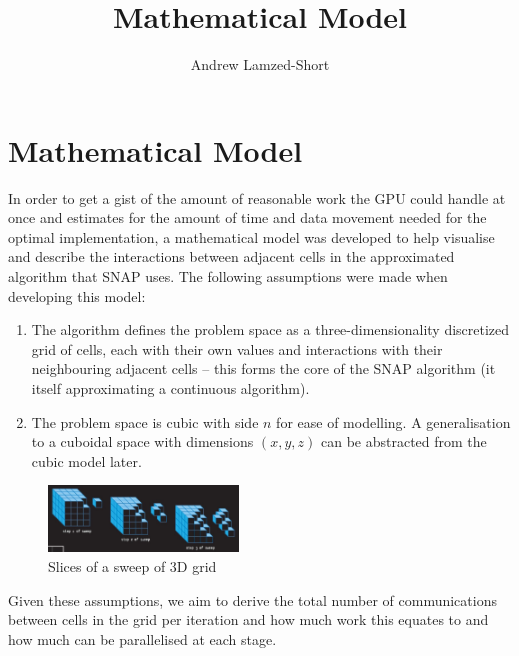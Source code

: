 \documentclass{article}
\begin{document}
\title{Mathematical Model}

\author{Andrew Lamzed-Short}

\maketitle

\section{Mathematical Model}

In order to get a gist of the amount of reasonable work the GPU could handle at once and estimates for the amount of time and data movement needed for the optimal implementation, a mathematical model was developed to help visualise and describe the interactions between adjacent cells in the approximated algorithm that SNAP uses. The following assumptions were made when developing this model:

\begin{enumerate}

\item The algorithm defines the problem space as a three-dimensionality discretized grid of cells, each with their own values and interactions with their neighbouring adjacent cells – this forms the core of the SNAP algorithm (it itself approximating a continuous algorithm).

\item The problem space is cubic with side $ n $ for ease of modelling. A generalisation to a cuboidal space with dimensions $ (x, y, z) $ can be abstracted from the cubic model later.

\end{enumerate}

\begin{figure}[h!]
\centering
\includegraphics[width=0.45\textwidth]{images/Sweep.jpg}
\caption{Slices of a sweep of 3D grid}
\label{fig:3dsweepslice}
\end{figure}

Given these assumptions, we aim to derive the total number of communications between cells in the grid per iteration and how much work this equates to and how much can be parallelised at each stage.
\end{document}
